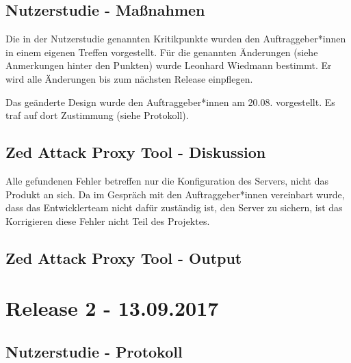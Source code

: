 \documentclass[accentcolor=tud0b,12pt,paper=a4]{tudreport}
\begin{document}
	\subsection*{Nutzerstudie - Maßnahmen}
	
	Die in der Nutzerstudie genannten Kritikpunkte wurden den Auftraggeber*innen in einem eigenen Treffen vorgestellt. Für die genannten Änderungen (siehe Anmerkungen hinter den Punkten) wurde Leonhard Wiedmann bestimmt. Er wird alle Änderungen bis zum nächsten Release einpflegen.
	
	Das geänderte Design wurde den Auftraggeber*innen am 20.08. vorgestellt. Es traf auf dort Zustimmung (siehe Protokoll).
	

	\subsection*{Zed Attack Proxy Tool - Diskussion}
	Alle gefundenen Fehler betreffen nur die Konfiguration des Servers, nicht das Produkt an sich. Da im Gespräch mit den Auftraggeber*innen vereinbart wurde, dass das Entwicklerteam nicht dafür zuständig ist, den Server zu sichern, ist das Korrigieren diese Fehler nicht Teil des Projektes.

	\subsection*{Zed Attack Proxy Tool - Output}
	

\section{Release 2 - 13.09.2017}

	\subsection*{Nutzerstudie - Protokoll}
	
	
\end{document}
